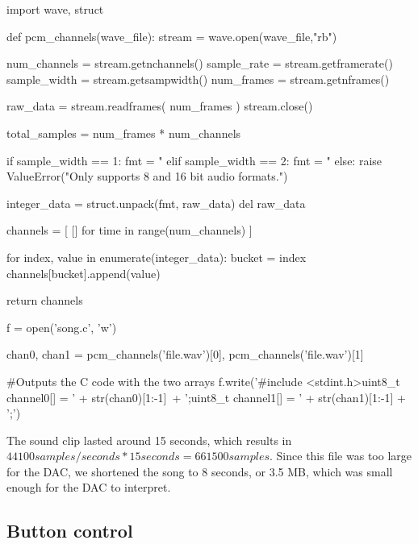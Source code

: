 \begin{code}
import wave, struct

def pcm_channels(wave_file):
    stream = wave.open(wave_file,"rb")

    num_channels = stream.getnchannels()
    sample_rate = stream.getframerate()
    sample_width = stream.getsampwidth()
    num_frames = stream.getnframes()

    raw_data = stream.readframes( num_frames )
    stream.close()

    total_samples = num_frames * num_channels

    if sample_width == 1: 
        fmt = "%
    elif sample_width == 2:
        fmt = "%
    else:
        raise ValueError("Only supports 8 and 16 bit audio formats.")

    integer_data = struct.unpack(fmt, raw_data)
    del raw_data

    channels = [ [] for time in range(num_channels) ]

    for index, value in enumerate(integer_data):
        bucket = index %
        channels[bucket].append(value)

    return channels

f = open('song.c', 'w')

chan0, chan1 = pcm_channels('file.wav')[0], pcm_channels('file.wav')[1]

#Outputs the C code with the two arrays
f.write('#include <stdint.h>\n\nconst uint8_t channel0[] = {' + str(chan0)[1:-1]\
 + '};\n\nconst uint8_t channel1[] = {' + str(chan1)[1:-1] + '};')

\end{code}

\newpage

The sound clip lasted around 15 seconds, which results in $44100 samples/seconds * 15 seconds = 661500 samples$. 
Since this file was too large for the DAC, we shortened the song to 8 seconds, or 3.5 MB, which was small enough for the DAC to interpret.


\subsection{Button control}
